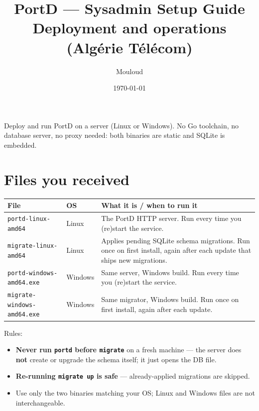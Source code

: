 \documentclass[11pt,a4paper]{article}
\title{PortD — Sysadmin Setup Guide\\ \large Deployment and operations (Algérie Télécom)}
\author{Mouloud}
\date{\today}
\newcommand{\chemin}[1]{\texttt{#1}}
\begin{document}
\begin{center}
\end{center}

\maketitle
\tableofcontents
\newpage

Deploy and run PortD on a server (Linux or Windows). No Go toolchain, no
database server, no proxy needed: both binaries are static and SQLite is
embedded.

\section{Files you received}

\begin{center}
\begin{tabular}{p{4cm}p{1.6cm}p{7.5cm}}
  \hline
  \textbf{File} & \textbf{OS} & \textbf{What it is / when to run it} \\ \hline
  \chemin{portd-linux-amd64} & Linux & The PortD HTTP server. Run every time you (re)start the service. \\ \hline
  \chemin{migrate-linux-amd64} & Linux & Applies pending SQLite schema migrations. Run once on first install, again after each update that ships new migrations. \\ \hline
  \chemin{portd-windows-amd64.exe} & Windows & Same server, Windows build. Run every time you (re)start the service. \\ \hline
  \chemin{migrate-windows-amd64.exe} & Windows & Same migrator, Windows build. Run once on first install, again after each update. \\ \hline
\end{tabular}
\end{center}

Rules:
\begin{itemize}[leftmargin=*]
  \item \textbf{Never run \chemin{portd} before \chemin{migrate}} on a fresh machine — the server does \textbf{not} create or upgrade the schema itself; it just opens the DB file.
  \item \textbf{Re-running \chemin{migrate up} is safe} — already-applied migrations are skipped.
  \item Use only the two binaries matching your OS; Linux and Windows files are not interchangeable.
\end{itemize}
\end{document}
